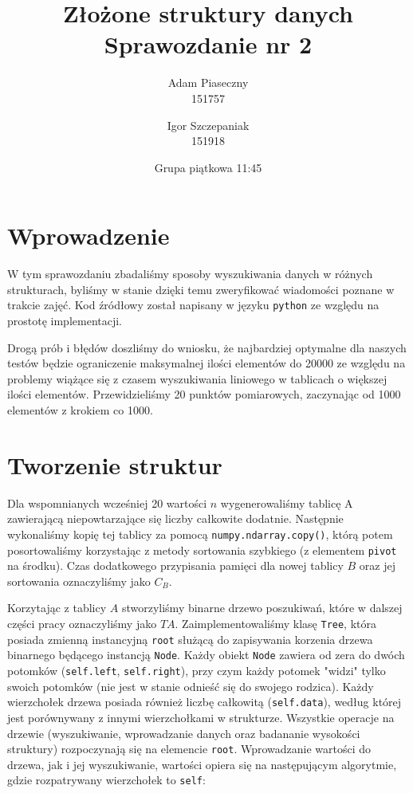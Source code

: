 \documentclass{article}
\title{\LARGE Złożone struktury danych \\ Sprawozdanie nr 2}
\author{Adam Piaseczny \\	151757 \and
				Igor Szczepaniak \\ 151918}
\date{Grupa piątkowa 11:45}
\begin{document}
\maketitle
\pagebreak

\tableofcontents
\pagebreak

\section{Wprowadzenie}

W tym sprawozdaniu zbadaliśmy sposoby wyszukiwania danych w różnych strukturach, byliśmy w stanie dzięki temu zweryfikować wiadomości poznane w trakcie zajęć. Kod źródłowy został napisany w języku \verb+python+ ze względu na prostotę implementacji.

Drogą prób i błędów doszliśmy do wniosku, że najbardziej optymalne dla naszych testów będzie ograniczenie maksymalnej ilości elementów do 20000 ze względu na problemy wiążące się z czasem wyszukiwania liniowego w tablicach o większej ilości elementów. Przewidzieliśmy 20 punktów pomiarowych, zaczynając od 1000 elementów z krokiem co 1000.

\section{Tworzenie struktur}

Dla wspomnianych wcześniej 20 wartości $n$ wygenerowaliśmy tablicę A zawierającą niepowtarzające się liczby całkowite dodatnie. Następnie wykonaliśmy kopię tej tablicy za pomocą \verb+numpy.ndarray.copy()+, którą potem posortowaliśmy korzystając z metody sortowania szybkiego (z elementem \verb+pivot+ na środku). Czas dodatkowego przypisania pamięci dla nowej tablicy $B$ oraz jej sortowania oznaczyliśmy jako $C_B$.

Korzytając z tablicy $A$ stworzyliśmy binarne drzewo poszukiwań, które w dalszej części pracy oznaczyliśmy jako $TA$. Zaimplementowaliśmy klasę \verb+Tree+, która posiada zmienną instancyjną \verb+root+ służącą do zapisywania korzenia drzewa binarnego będącego instancją \verb+Node+. Każdy obiekt \verb+Node+ zawiera od zera do dwóch potomków (\verb+self.left+, \verb+self.right+), przy czym każdy potomek "widzi" tylko swoich potomków (nie jest w stanie odnieść się do swojego rodzica). Każdy wierzchołek drzewa posiada również liczbę całkowitą (\verb+self.data+), według której jest porównywany z innymi wierzchołkami w strukturze. Wszystkie operacje na drzewie (wyszukiwanie, wprowadzanie danych oraz badananie wysokości struktury) rozpoczynają się na elemencie \verb+root+. Wprowadzanie wartości do drzewa, jak i jej wyszukiwanie, wartości opiera się na następującym algorytmie, gdzie rozpatrywany wierzchołek to \verb+self+:
\end{document}

